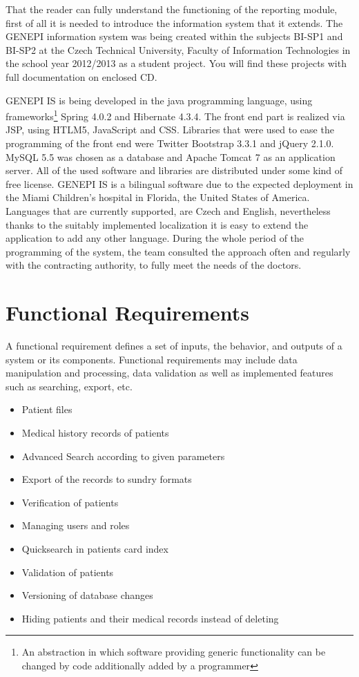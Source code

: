 \documentclass[thesis=B,english]{FITthesis}[2012/10/20]
\begin{document}
That the reader can fully understand the functioning of the reporting module, first of all it is needed to introduce the information system that it extends. The GENEPI information system was being created within the subjects BI-SP1 and BI-SP2 at the Czech Technical University, Faculty of Information Technologies in the school year 2012/2013 as a student project. You will find these projects with full documentation on enclosed CD.

GENEPI IS is being developed in the java programming language, using frameworks\footnote{An abstraction in which software providing generic functionality can be changed by code additionally added by a programmer}  Spring 4.0.2 and Hibernate 4.3.4. The front end part is realized via JSP, using HTLM5, JavaScript and CSS. Libraries that were used to ease the programming of the front end were Twitter Bootstrap 3.3.1 and jQuery 2.1.0.  MySQL 5.5 was chosen as a database and  Apache Tomcat 7 as an application server. All of the used software and libraries are distributed under some kind of free license. GENEPI IS is a bilingual software due to the expected deployment in the Miami Children's hospital in Florida, the United States of America. Languages that are currently supported, are Czech and English, nevertheless thanks to the suitably implemented localization it is easy to extend the application to add any other language. During the whole period of the programming of the system, the team consulted the approach often  and regularly with the contracting authority, to fully meet the needs of the doctors.

\section{Functional Requirements}
A functional requirement defines a set of inputs, the behavior, and outputs of a system or its components. Functional requirements may include data manipulation and processing, data validation as well as implemented features such as searching, export, etc.
\begin{itemize}
  \item Patient files
  \item Medical history records of patients
  \item Advanced Search according to given parameters
  \item Export of the records to sundry formats
  \item Verification of patients
  \item Managing users and roles
  \item Quicksearch in patients card index
  \item Validation of patients
  \item Versioning of database changes
  \item Hiding patients and their medical records instead of deleting
\end{itemize}
\end{document}
